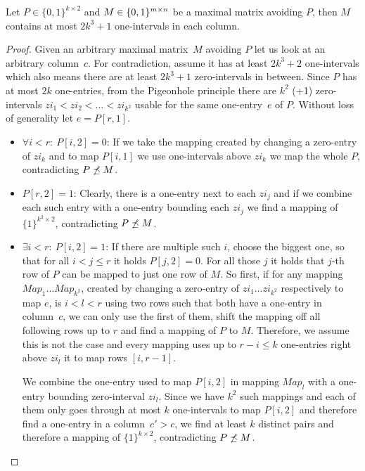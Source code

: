 \begin{lemma}
\label{lemma:twocols2}
Let $P\in\{0,1\}^{k\times 2}$ and $M\in\{0,1\}^{m\times n}$ be a maximal matrix avoiding $P$, then $M$ contains at most $2k^3+1$ one-intervals in each column.
\end{lemma}
\begin{proof}
Given an arbitrary maximal matrix~$M$ avoiding $P$ let us look at an arbitrary column~$c$. For contradiction, assume it has at least $2k^3+2$ one-intervals which also means there are at least $2k^3+1$ zero-intervals in between. Since $P$ has at most $2k$ one-entries, from the Pigeonhole principle there are $k^2$ (+1) zero-intervals $zi_1<zi_2<\dots<zi_{k^2}$ usable for the same one-entry~$e$ of $P$. Without loss of generality let $e=P[r,1]$.
\begin{itemize}
	\item $\forall i<r:\ P[i,2]=0$: If we take the mapping created by changing a zero-entry of $zi_k$ and to map $P[i,1]$ we use one-intervals above $zi_k$ we map the whole $P$, contradicting $P\not\preceq M$.
	\item $P[r,2]=1$: Clearly, there is a one-entry next to each $zi_j$ and if we combine each such entry with a one-entry bounding each $zi_j$ we find a mapping of $\{1\}^{k^2\times2}$, contradicting $P\not\preceq M$.
	\item $\exists i<r:\ P[i,2]=1$: If there are multiple such $i$, choose the biggest one, so that for all $i<j\leq r$ it holds $P[j,2]=0$. For all those $j$ it holds that $j$-th row of $P$ can be mapped to just one row of $M$. So first, if for any mapping $Map_1\dots Map_{k^2}$, created by changing a zero-entry of $zi_1\dots zi_{k^2}$ respectively to map $e$, is $i<l<r$ using two rows such that both have a one-entry in column~$c$, we can only use the first of them, shift the mapping off all following rows up to $r$ and find a mapping of $P$ to $M$. Therefore, we assume this is not the case and every mapping uses up to $r-i\leq k$ one-entries right above $zi_l$ it to map rows $[i,r-1]$.
	
		We combine the one-entry used to map $P[i,2]$ in mapping $Map_l$ with a one-entry bounding zero-interval $zi_l$. Since we have $k^2$ such mappings and each of them only goes through at most $k$ one-intervals to map $P[i,2]$ and therefore find a one-entry in a column~$c'>c$, we find at least $k$ distinct pairs and therefore a mapping of $\{1\}^{k\times2}$, contradicting $P\not\preceq M$.
\end{itemize}
\end{proof}

